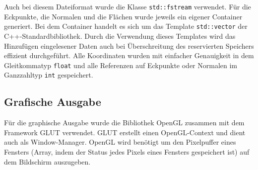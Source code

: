 \documentclass[crop=false]{standalone}
\begin{document}

      Auch bei diesem Dateiformat wurde die Klasse \texttt{std::fstream} verwendet.
      Für die Eckpunkte, die Normalen und die Flächen wurde jeweils ein eigener Container generiert.
      Bei dem Container handelt es sich um das Template \texttt{std::vector} der C++-Standardbibliothek.
      Durch die Verwendung dieses Templates wird das Hinzufügen eingelesener Daten auch bei Überschreitung des reservierten Speichers effizient durchgeführt.
      Alle Koordinaten wurden mit einfacher Genauigkeit in dem Gleitkommatyp \texttt{float} und alle Referenzen auf Eckpunkte oder Normalen im Ganzzahltyp \texttt{int} gespeichert.

    \subsection{Grafische Ausgabe} %
    \label{ssub:ausgabe}
      Für die graphische Ausgabe wurde die Bibliothek OpenGL zusammen mit dem Framework GLUT verwendet.
      GLUT erstellt einen OpenGL-Context und dient auch als Window-Manager.
      OpenGL wird benötigt um den Pixelpuffer eines Fensters (Array, indem der Status jedes Pixels eines Fensters gespeichert ist) auf dem Bildschirm auszugeben.
\end{document}
